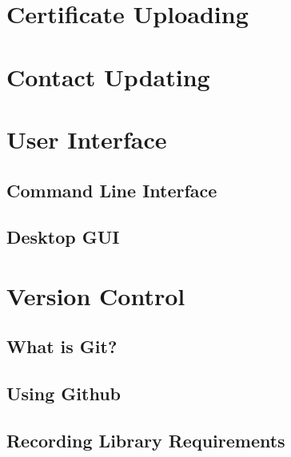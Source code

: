\documentclass[11pt]{article}
\begin{document}
\newpage

\section{Certificate Uploading}




\newpage

\section{Contact Updating}



\newpage

\section{User Interface}

\subsection{Command Line Interface}






\subsection{Desktop GUI}




\newpage

\section{Version Control}

\subsection{What is Git?}



\subsection{Using Github}



\subsection{Recording Library Requirements}
\end{document}
